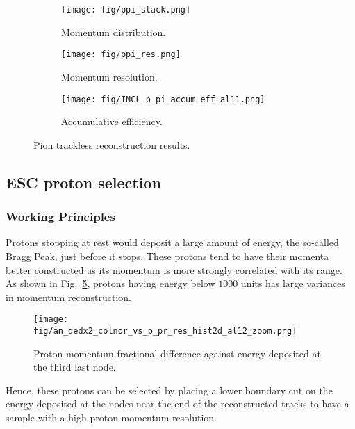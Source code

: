            \begin{figure}[t]
               \centering
               \begin{subfigure}{0.3\textwidth}
                    \texttt{[image: fig/ppi\_stack.png]}
                    \caption{Momentum distribution.}
                    \label{fig:ppi-stack}
               \end{subfigure}
               \begin{subfigure}{0.3\textwidth}
                    \texttt{[image: fig/ppi\_res.png]}
                    \caption{Momentum resolution.}
                    \label{fig:ppi-res}
               \end{subfigure}
               \begin{subfigure}{0.3\textwidth}
                    \texttt{[image: fig/INCL\_p\_pi\_accum\_eff\_al11.png]}
                    \caption{Accumulative efficiency.}
                    \label{fig:tl-accum-eff}
               \end{subfigure}
               \caption{Pion trackless reconstruction results.}
               \label{fig:piTLres}
            \end{figure}
            
    \subsection{ESC proton selection}

         \subsubsection{Working Principles}
         Protons stopping at rest would deposit a large amount of energy, the so-called Bragg Peak, just before it stops.
         These protons tend to have their momenta better constructed as its momentum is more strongly correlated with its range. As shown in Fig.~\ref{fig:andedx2}, protons having energy below $1000$ units has large variances in momentum reconstruction. 
         \begin{figure}[h]
             \centering
             \texttt{[image: fig/an\_dedx2\_colnor\_vs\_p\_pr\_res\_hist2d\_al12\_zoom.png]}
             \caption{Proton momentum fractional difference against energy deposited at the third last node.}
             \label{fig:andedx2}
         \end{figure}
         Hence, these protons can be selected by placing a lower boundary cut on the energy deposited at the nodes near the end of the reconstructed tracks to have a sample with a high proton momentum resolution.   
         
